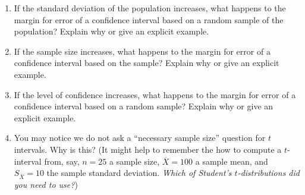 \documentclass{ccg-topic}
\begin{document}
\begin{enumerate}
    \item If the standard deviation of the population increases, what happens to the margin for error of a confidence interval based on a random sample of the population? Explain why or give an explicit example.
    
    \vfill
    
    \item If the sample size increases, what happens to the margin for error of a confidence interval based on the sample? Explain why or give an explicit example.
    
    \vfill

    \newpage    

    \item If the level of confidence increases, what happens to the margin for error of a confidence interval based on a random sample? Explain why or give an explicit example.
    
    \vfill
    
    \item You may notice we do not ask a ``necessary sample size'' question for $t$ intervals. Why is this? (It might help to remember the how to compute a $t$-interval from, say, $n=25$ a sample size, $\overline{X} = 100$ a sample mean, and $S_{\overline{X}} = 10$ the sample standard deviation. \emph{Which of Student's $t$-distributions did you need to use?})

    \vfill    
\end{enumerate}
\end{document}
